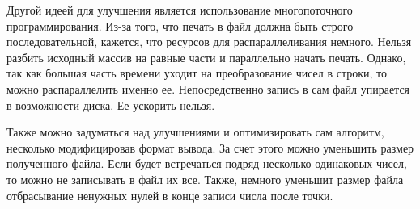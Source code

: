 Другой идеей для улучшения является использование многопоточного программирования. 
Из-за того, что печать в файл должна быть строго последовательной, кажется, что ресурсов для распараллеливания немного.
Нельзя разбить исходный массив на равные части и параллельно начать печать.
Однако, так как большая часть времени уходит на преобразование чисел в строки, то можно распараллелить именно ее.
Непосредственно запись в сам файл упирается в возможности диска. 
Ее ускорить нельзя.

Также можно задуматься над улучшениями и оптимизировать сам алгоритм, несколько модифицировав формат вывода.
За счет этого можно уменьшить размер полученного файла.
Если будет встречаться подряд несколько одинаковых чисел, то можно не записывать в файл их все.
Также, немного уменьшит размер файла отбрасывание ненужных нулей в конце записи числа после точки.

